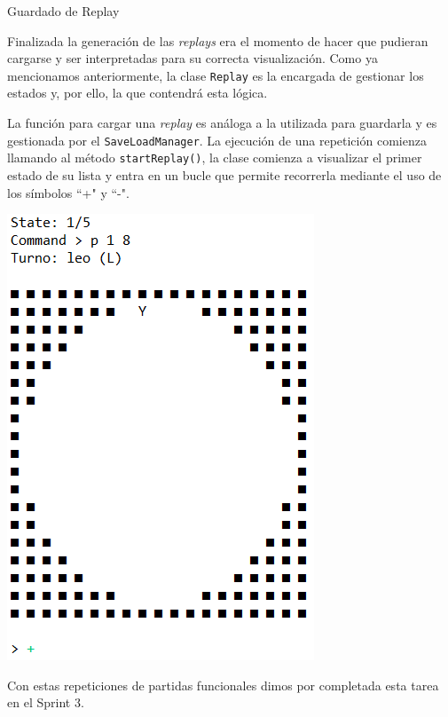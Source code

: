 \documentclass[../DocumentoOficial.tex]{subfiles}
\begin{document}
\begin{sprint}[3]
\begin{center}
Guardado de Replay
\end{center}

Finalizada la generación de las \textit{replays} era el momento de hacer que pudieran cargarse y ser interpretadas para su correcta visualización. Como ya mencionamos anteriormente, la clase \texttt{Replay} es la encargada de gestionar los estados y, por ello, la que contendrá esta lógica.

La función para cargar una \textit{replay} es análoga a la utilizada para guardarla y es gestionada por el \texttt{SaveLoadManager}. La ejecución de una repetición comienza llamando al método \texttt{startReplay()}, la clase comienza a visualizar el primer estado de su lista y entra en un bucle que permite recorrerla mediante el uso de los símbolos ``+" y ``-".

\begin{center}
\includegraphics[scale=0.7]{consola-replay-sprint-3.png}
\end{center}

Con estas repeticiones de partidas funcionales dimos por completada esta tarea en el Sprint 3.
\end{sprint}
\end{document}
